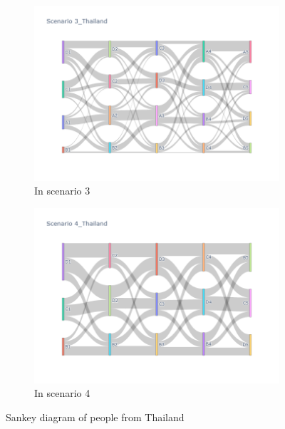 \begin{figure}[h]
\begin{subfigure}{0.5\textwidth}
    \includegraphics[width=\linewidth]{Figure/figure34c.png}
    \caption{In scenario 3}
    \label{fig34c}
  \end{subfigure}
  \begin{subfigure}{0.5\textwidth}
    \centering
    \includegraphics[width=\linewidth]{Figure/figure34d.png}
    \caption{In scenario 4}
    \label{fig34d}
  \end{subfigure}
  \caption{ Sankey diagram of people from Thailand}
  \label{fig34}
\end{figure}

